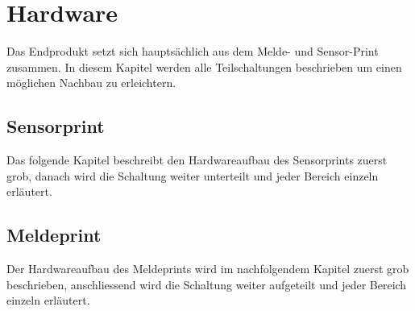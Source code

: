 \section{Hardware}
Das Endprodukt setzt sich hauptsächlich aus dem Melde- und Sensor-Print zusammen. In diesem Kapitel werden alle Teilschaltungen beschrieben um einen möglichen Nachbau zu erleichtern.
\subsection{Sensorprint}
Das folgende Kapitel beschreibt den Hardwareaufbau des Sensorprints zuerst grob, danach wird die Schaltung weiter unterteilt und jeder Bereich einzeln erläutert.
\subsection{Meldeprint}
Der Hardwareaufbau des Meldeprints wird im nachfolgendem Kapitel zuerst grob beschrieben, anschliessend wird die Schaltung weiter aufgeteilt und jeder Bereich einzeln erläutert.
